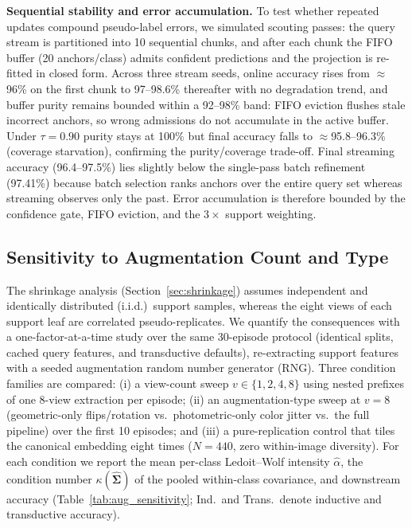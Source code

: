 \documentclass[preprint,12pt]{elsarticle}
\begin{document}
\textbf{Sequential stability and error accumulation.} To test whether repeated updates compound pseudo-label errors, we simulated scouting passes: the query stream is partitioned into 10 sequential chunks, and after each chunk the FIFO buffer (20 anchors/class) admits confident predictions and the projection is re-fitted in closed form. Across three stream seeds, online accuracy rises from $\approx$96\% on the first chunk to 97--98.6\% thereafter with no degradation trend, and buffer purity remains bounded within a 92--98\% band: FIFO eviction flushes stale incorrect anchors, so wrong admissions do not accumulate in the active buffer. Under $\tau = 0.90$ purity stays at 100\% but final accuracy falls to $\approx$95.8--96.3\% (coverage starvation), confirming the purity/coverage trade-off. Final streaming accuracy (96.4--97.5\%) lies slightly below the single-pass batch refinement (97.41\%) because batch selection ranks anchors over the entire query set whereas streaming observes only the past. Error accumulation is therefore bounded by the confidence gate, FIFO eviction, and the $3\times$ support weighting.

\subsection{Sensitivity to Augmentation Count and Type}
\label{sec:aug_sensitivity}
The shrinkage analysis (Section~\ref{sec:shrinkage}) assumes independent and identically distributed (i.i.d.)\ support samples, whereas the eight views of each support leaf are correlated pseudo-replicates. We quantify the consequences with a one-factor-at-a-time study over the same 30-episode protocol (identical splits, cached query features, and transductive defaults), re-extracting support features with a seeded augmentation random number generator (RNG). Three condition families are compared: (i) a view-count sweep $v\in\{1,2,4,8\}$ using nested prefixes of one 8-view extraction per episode; (ii) an augmentation-type sweep at $v=8$ (geometric-only flips/rotation vs.\ photometric-only color jitter vs.\ the full pipeline) over the first 10 episodes; and (iii) a pure-replication control that tiles the canonical embedding eight times ($N=440$, zero within-image diversity). For each condition we report the mean per-class Ledoit--Wolf intensity $\hat{\alpha}$, the condition number $\kappa(\hat{\mathbf{\Sigma}})$ of the pooled within-class covariance, and downstream accuracy (Table~\ref{tab:aug_sensitivity}; Ind.\ and Trans.\ denote inductive and transductive accuracy).
\end{document}
